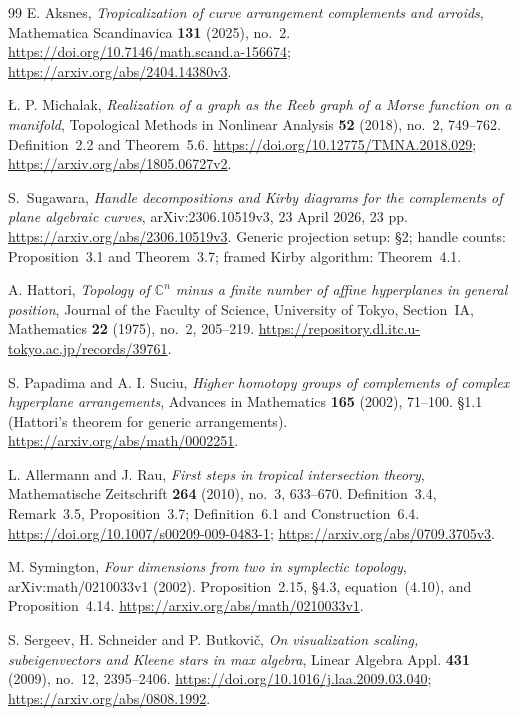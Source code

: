\begin{thebibliography}{99}
E. Aksnes,
\emph{Tropicalization of curve arrangement complements and arroids},
Mathematica Scandinavica \textbf{131} (2025), no.~2.
\url{https://doi.org/10.7146/math.scand.a-156674};
\url{https://arxiv.org/abs/2404.14380v3}.

\L{}. P. Michalak,
\emph{Realization of a graph as the Reeb graph of a Morse function on a manifold},
Topological Methods in Nonlinear Analysis \textbf{52} (2018), no.~2, 749--762.
Definition~2.2 and Theorem~5.6.
\url{https://doi.org/10.12775/TMNA.2018.029};
\url{https://arxiv.org/abs/1805.06727v2}.

S.~Sugawara,
\emph{Handle decompositions and Kirby diagrams for the complements of plane algebraic curves},
arXiv:2306.10519v3, 23 April 2026, 23 pp.
\url{https://arxiv.org/abs/2306.10519v3}.
Generic projection setup: \S2; handle counts: Proposition~3.1 and Theorem~3.7;
framed Kirby algorithm: Theorem~4.1.

A. Hattori,
\emph{Topology of $\mathbb C^n$ minus a finite number of affine hyperplanes in general position},
Journal of the Faculty of Science, University of Tokyo, Section~IA, Mathematics
\textbf{22} (1975), no.~2, 205--219.
\url{https://repository.dl.itc.u-tokyo.ac.jp/records/39761}.


S. Papadima and A. I. Suciu,
\emph{Higher homotopy groups of complements of complex hyperplane arrangements},
Advances in Mathematics \textbf{165} (2002), 71--100.
\S1.1 (Hattori's theorem for generic arrangements).
\url{https://arxiv.org/abs/math/0002251}.


L. Allermann and J. Rau,
\emph{First steps in tropical intersection theory},
Mathematische Zeitschrift \textbf{264} (2010), no.~3, 633--670.
Definition~3.4, Remark~3.5, Proposition~3.7;
Definition~6.1 and Construction~6.4.
\url{https://doi.org/10.1007/s00209-009-0483-1};
\url{https://arxiv.org/abs/0709.3705v3}.

M. Symington,
\emph{Four dimensions from two in symplectic topology},
arXiv:math/0210033v1 (2002).
Proposition~2.15, \S4.3, equation~(4.10), and Proposition~4.14.
\url{https://arxiv.org/abs/math/0210033v1}.

S. Sergeev, H. Schneider and P. Butkovi\v c,
\emph{On visualization scaling, subeigenvectors and Kleene stars in max algebra},
Linear Algebra Appl. \textbf{431} (2009), no.~12, 2395--2406.
\url{https://doi.org/10.1016/j.laa.2009.03.040};
\url{https://arxiv.org/abs/0808.1992}.


\end{thebibliography}
